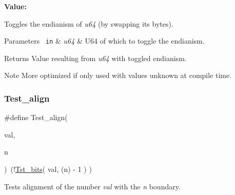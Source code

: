 {\bfseries Value\+:}
\begin{DoxyCode}{0}

\end{DoxyCode}


Toggles the endianism of {\itshape u64} (by swapping its bytes). 


\begin{DoxyParams}[1]{Parameters}
\mbox{\texttt{ in}}  & {\em u64} & U64 of which to toggle the endianism.\\
\hline
\end{DoxyParams}
\begin{DoxyReturn}{Returns}
Value resulting from {\itshape u64} with toggled endianism.
\end{DoxyReturn}
\begin{DoxyNote}{Note}
More optimized if only used with values unknown at compile time. 
\end{DoxyNote}
\mbox{\label{group__group__sam0__utils_gad490b657cb147d3d1773f6559559b98b}} 
\subsubsection{\texorpdfstring{Test\_align}{Test\_align}}
{\footnotesize\ttfamily \#define Test\+\_\+align(\begin{DoxyParamCaption}\item[{}]{val,  }\item[{}]{n }\end{DoxyParamCaption})~(!\mbox{\hyperlink{group__group__sam0__utils_gab1e92741077b101e6b2df74880e71e96}{Tst\+\_\+bits}}( val, (n) -\/ 1     )   )}



Tests alignment of the number {\itshape val} with the {\itshape n} boundary. 


